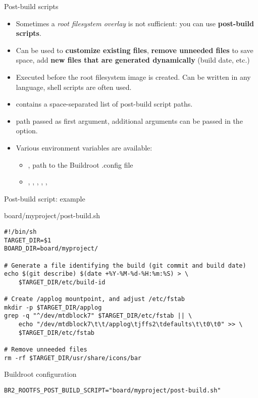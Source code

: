 \begin{frame}{Post-build scripts}
  \begin{itemize}
  \item Sometimes a {\em root filesystem overlay} is not sufficient:
    you can use {\bf post-build scripts}.
  \item Can be used to {\bf customize existing files}, {\bf remove
      unneeded files} to save space, add {\bf new files that are
      generated dynamically} (build date, etc.)
  \item Executed before the root filesystem image is created. Can be
    written in any language, shell scripts are often used.
  \item {} contains a space-separated
    list of post-build script paths.
  \item {} path passed as first argument, additional
    arguments can be passed in the 
    option.
  \item Various environment variables are available:
    \begin{itemize}
      \item {}, path to the Buildroot .config file
      \item {}, , ,
        , , 
      \end{itemize}
  \end{itemize}
\end{frame}

\begin{frame}[fragile]{Post-build script: example}

\begin{block}{board/myproject/post-build.sh}
\begin{verbatim}
#!/bin/sh
TARGET_DIR=$1
BOARD_DIR=board/myproject/

# Generate a file identifying the build (git commit and build date)
echo $(git describe) $(date +%Y-%M-%d-%H:%m:%S) > \
    $TARGET_DIR/etc/build-id

# Create /applog mountpoint, and adjust /etc/fstab
mkdir -p $TARGET_DIR/applog
grep -q "^/dev/mtdblock7" $TARGET_DIR/etc/fstab || \
    echo "/dev/mtdblock7\t\t/applog\tjffs2\tdefaults\t\t0\t0" >> \
    $TARGET_DIR/etc/fstab

# Remove unneeded files
rm -rf $TARGET_DIR/usr/share/icons/bar
\end{verbatim}
\end{block}

\begin{block}{Buildroot configuration}
{\scriptsize
\begin{verbatim}
BR2_ROOTFS_POST_BUILD_SCRIPT="board/myproject/post-build.sh"
\end{verbatim}}
\end{block}

\end{frame}

